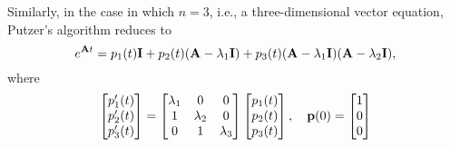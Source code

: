 Similarly, in the case in which \(n = 3\), i.e., a three-dimensional vector equation, Putzer's algorithm reduces to
\[e^{\mathbf{A} t} = p_1(t) \mathbf{I} + p_2(t) (\mathbf{A} - \lambda_1 \mathbf{I}) + p_3(t)(\mathbf{A} - \lambda_1 \mathbf{I})(\mathbf{A} - \lambda_2 \mathbf{I}),\]
where
\[\begin{bmatrix}
        p'_1(t) \\
        p'_2(t) \\
        p'_3(t)
    \end{bmatrix} =
    \begin{bmatrix}
        \lambda_1 & 0         & 0         \\
        1         & \lambda_2 & 0         \\
        0         & 1         & \lambda_3
    \end{bmatrix}
    \begin{bmatrix}
        p_1(t) \\
        p_2(t) \\
        p_3(t)
    \end{bmatrix},
    \quad
    \mathbf{p}(0) = \begin{bmatrix}
        1 \\ 0 \\ 0
    \end{bmatrix}
\]